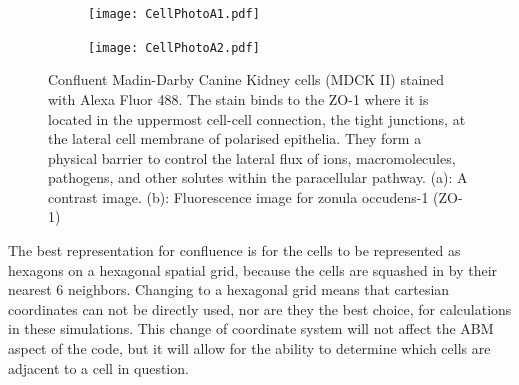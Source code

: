 \documentclass[a4paper]{article}
\begin{document}
\begin{figure}[h]
    \centering
    \begin{subfigure}[b]{0.4\linewidth}
        \texttt{[image: CellPhotoA1.pdf]}
        \caption{}
        \label{fig:A1}
    \end{subfigure}
    \begin{subfigure}[b]{0.4\linewidth}
        \texttt{[image: CellPhotoA2.pdf]}
        \caption{}
        \label{fig:A2}
    \end{subfigure}
    \caption{Confluent Madin-Darby Canine Kidney cells (MDCK II) stained with Alexa Fluor 488. The stain binds to the ZO-1 where it is located in the uppermost cell-cell connection, the tight junctions, at the lateral cell membrane of polarised epithelia. They form a physical barrier to control the lateral flux of ions, macromolecules, pathogens, and other solutes within the paracellular pathway. (a): A contrast image. (b): Fluorescence image for zonula occudens-1 (ZO-1)}
    \label{fig:HexagonalCells}
\end{figure}

The best representation for confluence is for the cells to be represented as hexagons on a hexagonal spatial grid, because the cells are squashed in by their nearest 6 neighbors. Changing to a hexagonal grid means that cartesian coordinates can not be directly used, nor are they the best choice, for calculations in these simulations. This change of coordinate system will not affect the ABM aspect of the code, but it will allow for the ability to determine which cells are adjacent to a cell in question. 
\end{document}
